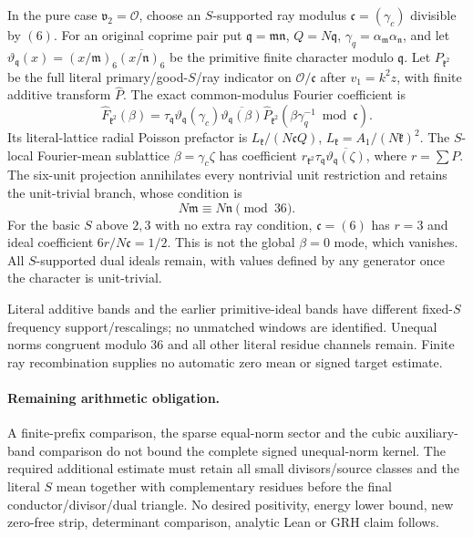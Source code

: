 \begin{proposition}
\label{cbk:ray}
In the pure case $\mathfrak v_2=\mathcal O$, choose an $S$-supported
ray modulus $\mathfrak c=(\gamma_c)$ divisible by $(6)$. For an
original coprime pair put $\mathfrak q=\mathfrak m\mathfrak n$,
$Q=N\mathfrak q$, $\gamma_q=\alpha_{\mathfrak m}\alpha_{\mathfrak n}$,
and let $\vartheta_{\mathfrak q}(x)=(x/\mathfrak m)_6
\overline{(x/\mathfrak n)_6}$ be the primitive finite character modulo
$\mathfrak q$. Let $P_{\mathfrak k^2}$ be the full literal
primary/good-$S$/ray indicator on $\mathcal O/\mathfrak c$ after
$v_1=k^2z$, with finite additive transform $\widehat P$.
The exact common-modulus Fourier coefficient is
\begin{equation}\label{cbk:ray-Fourier}
 \widehat F_{\mathfrak k^2}(\beta)
 =\tau_{\mathfrak q}\vartheta_{\mathfrak q}(\gamma_c)
       \overline{\vartheta_{\mathfrak q}(\beta)}
       \widehat P_{\mathfrak k^2}
                    (\beta\gamma_q^{-1}\bmod\mathfrak c).
\end{equation}
Its literal-lattice radial Poisson prefactor is
$L_{\mathfrak k}/(N\mathfrak c Q)$,
$L_{\mathfrak k}=A_1/(N\mathfrak k)^2$.
The $S$-local Fourier-mean sublattice $\beta=\gamma_c\zeta$ has
coefficient $r_{\mathfrak k^2}\tau_{\mathfrak q}
\overline{\vartheta_{\mathfrak q}(\zeta)}$, where $r=\sum P$.
The six-unit projection annihilates every nontrivial unit restriction
and retains the unit-trivial branch, whose condition is
\begin{equation}\label{cbk:unit-selection}
 N\mathfrak m\equiv N\mathfrak n\pmod{36}.
\end{equation}
For the basic $S$ above $2,3$ with no extra ray condition,
$\mathfrak c=(6)$ has $r=3$ and ideal coefficient
$6r/N\mathfrak c=1/2$. This is not the global $\beta=0$ mode,
which vanishes. All $S$-supported dual ideals remain, with values
defined by any generator once the character is unit-trivial.
\end{proposition}
Literal additive bands and the earlier primitive-ideal bands have
different fixed-$S$ frequency support/rescalings; no unmatched windows
are identified. Unequal norms congruent modulo $36$ and all other
literal residue channels remain. Finite ray recombination supplies
no automatic zero mean or signed target estimate.

\paragraph{Remaining arithmetic obligation.}\label{cbk:boundary}
A finite-prefix comparison, the sparse equal-norm sector and the
cubic auxiliary-band comparison do not bound the complete signed
unequal-norm kernel. The required additional estimate must retain
all small divisors/source classes and the literal $S$ mean together
with complementary residues before the final conductor/divisor/dual
triangle. No desired positivity, energy lower bound, new zero-free
strip, determinant comparison, analytic Lean or GRH claim follows.
